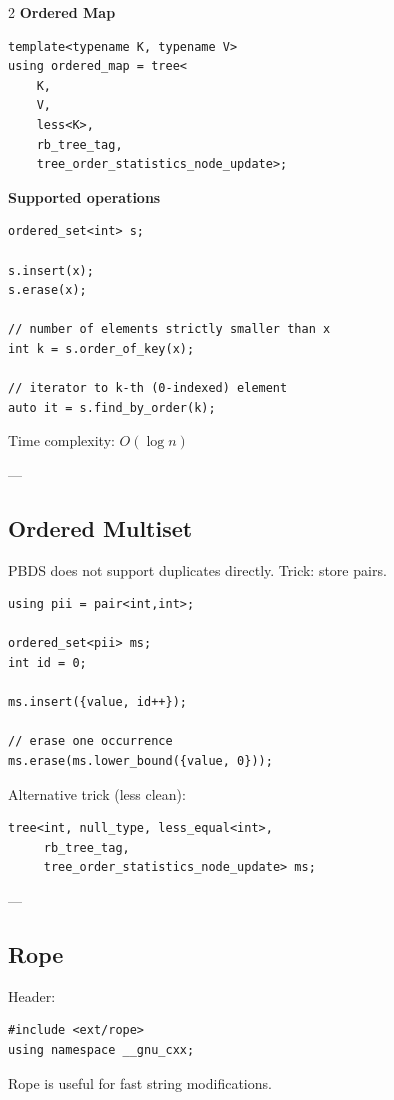 \documentclass[a4paper,landscape]{article}
\begin{document}
\begin{multicols}{2}
\textbf{Ordered Map}

\begin{lstlisting}
template<typename K, typename V>
using ordered_map = tree<
    K,
    V,
    less<K>,
    rb_tree_tag,
    tree_order_statistics_node_update>;
\end{lstlisting}

\textbf{Supported operations}

\begin{lstlisting}
ordered_set<int> s;

s.insert(x);
s.erase(x);

// number of elements strictly smaller than x
int k = s.order_of_key(x);

// iterator to k-th (0-indexed) element
auto it = s.find_by_order(k);
\end{lstlisting}

Time complexity: \(O(\log n)\)

---

\subsection*{Ordered Multiset}

PBDS does not support duplicates directly.  
Trick: store pairs.

\begin{lstlisting}
using pii = pair<int,int>;

ordered_set<pii> ms;
int id = 0;

ms.insert({value, id++});

// erase one occurrence
ms.erase(ms.lower_bound({value, 0}));
\end{lstlisting}

Alternative trick (less clean):
\begin{lstlisting}
tree<int, null_type, less_equal<int>,
     rb_tree_tag,
     tree_order_statistics_node_update> ms;
\end{lstlisting}

---

\subsection*{Rope}

Header:
\begin{lstlisting}
#include <ext/rope>
using namespace __gnu_cxx;
\end{lstlisting}

Rope is useful for fast string modifications.


\end{multicols}
\end{document}
